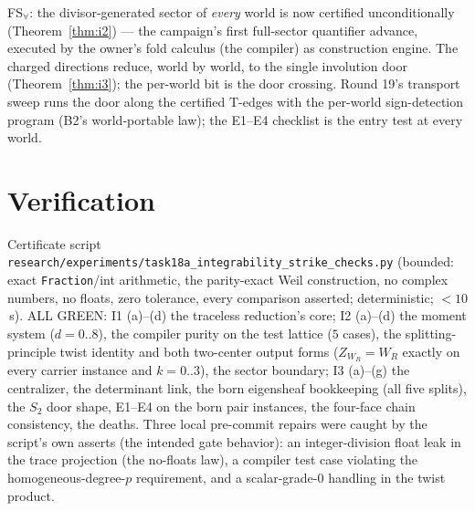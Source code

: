 \documentclass[11pt]{article}
\begin{document}
FS$_\forall$: the divisor-generated sector of \emph{every} world is now certified
unconditionally (Theorem~\ref{thm:i2}) --- the campaign's first full-sector quantifier
advance, executed by the owner's fold calculus (the compiler) as construction engine.
The charged directions reduce, world by world, to the single involution door
(Theorem~\ref{thm:i3}); the per-world bit is the door crossing. Round 19's transport
sweep runs the door along the certified T-edges with the per-world sign-detection
program (B2's world-portable law); the E1--E4 checklist is the entry test at every
world.

\section{Verification}

Certificate script \texttt{research/experiments/task18a\_integrability\_strike\_checks.py}
(bounded: exact \texttt{Fraction}/int arithmetic, the parity-exact Weil construction, no
complex numbers, no floats, zero tolerance, every comparison asserted; deterministic;
$<10$\,s). ALL GREEN: I1 (a)--(d) the traceless reduction's core; I2 (a)--(d) the moment
system ($d=0..8$), the compiler purity on the test lattice ($5$ cases), the
splitting-principle twist identity and both two-center output forms
($Z_{W_R}=W_R$ exactly on every carrier instance and $k=0..3$), the sector boundary;
I3 (a)--(g) the centralizer, the determinant link, the born eigensheaf bookkeeping
(all five splits), the $S_2$ door shape, E1--E4 on the born pair instances, the
four-face chain consistency, the deaths.
Three local pre-commit repairs were caught by the script's own asserts (the intended
gate behavior): an integer-division float leak in the trace projection (the no-floats
law), a compiler test case violating the homogeneous-degree-$p$ requirement, and a
scalar-grade-0 handling in the twist product.
\end{document}
